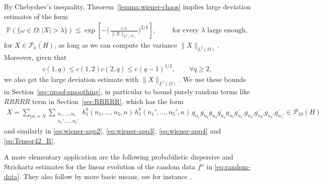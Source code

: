 \documentclass[11pt, xcolor = dvipsnames,reqno
]{amsart}
\theoremstyle{definition}
\theoremstyle{remark}
\begin{document}
    By Chebyshev's inequality, Theorem~\ref{lemma:wiener-chaos} implies large deviation estimates of the form
    \begin{align*}
        \mathbb{P}\left( \{ \omega \in \Omega : |X| > \lambda \} \right) \lesssim
        \exp \left[ - \bigg( \frac{ c\,  \lambda}{ \, \|X\|_{L^2(\Omega)} }\bigg)^{2/k} \right], 
        \qquad \text{ for every } \lambda \text{ large enough, } 
    \end{align*}
    for $X \in \overline{\mathcal P_k(H)}$, 
    as long as we can compute the variance $\lVert X \rVert_{L^2(\Omega)}$. 
    Moreover, given that
    \begin{align}
        c(1,q) \leq c(1,2)c(2,q) \leq e(q-1)^{1/2}, \qquad \forall q \geq 2, 
    \end{align}
    we also get the large deviation estimate with $\lVert X \rVert_{L^1(\Omega)}$. 
    We use these bounds in Section~\ref{sec:proof-smoothing}, in particular to bound purely random terms like $RRRRR$ term in Section~\ref{sec:RRRRR}, which has the form
    \begin{align*}
        X = \sum_{|n| \simeq N} \sum_{ \substack{ n_1, \ldots, n_5 \\ n_1', \ldots , n_5'}}  h^b_1(n_1, \ldots, n_5, n) \, h^b_1(n_1', \ldots, n_5',n) \,  g_{n_1} \overline{g_{n_2}}  g_{n_3} \overline{g_{n_4}} g_{n_5} \overline{g_{n_1'}} g_{n_2'} \overline{g_{n_3'}} g_{n_4'} \overline{g_{n_5'}} 
        \in \mathcal{P}_{10}(H)
    \end{align*}
    and similarly in \eqref{eq:wiener-app2}, \eqref{eq:wiener-app3}, \eqref{eq:wiener-app4} and \eqref{eq:Tensor42_R}. 

    A more elementary application 
    are the following probabilistic dispersive and Strichartz estimates for the linear evolution of the random data $f^\omega$ in \eqref{eq:random-data}. They also follow by more basic means, see for instance \cite[Section 3]{BurqTzvetkov2008-1}. 
    
\end{document}
